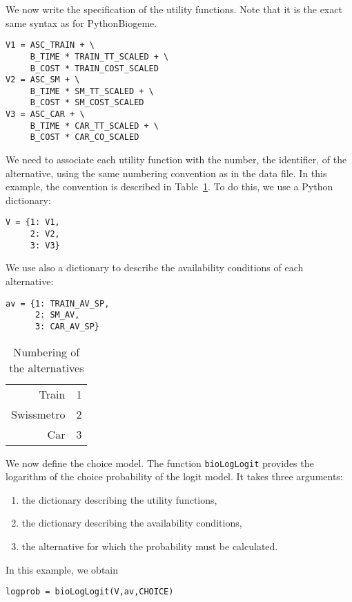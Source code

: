 \documentclass[12pt,a4paper]{article}
\newcommand{\PBIOGEME}{PythonBiogeme}
\begin{document}
We now write the specification of the
utility functions. Note that it is the exact same syntax as for \PBIOGEME.

\begin{lstlisting}[style=nonumbers]
V1 = ASC_TRAIN + \
     B_TIME * TRAIN_TT_SCALED + \
     B_COST * TRAIN_COST_SCALED
V2 = ASC_SM + \
     B_TIME * SM_TT_SCALED + \
     B_COST * SM_COST_SCALED
V3 = ASC_CAR + \
     B_TIME * CAR_TT_SCALED + \
     B_COST * CAR_CO_SCALED
\end{lstlisting}

We need to associate each utility function with the number, the identifier, of the
alternative, using the same numbering convention as in the data file. In this
example, the convention is described in Table~\ref{tab:choice}. To do
this, we use a Python dictionary:
\begin{lstlisting}[style=nonumbers]
V = {1: V1,
     2: V2,
     3: V3}
\end{lstlisting}
We use also a dictionary to describe the availability conditions of
each alternative:
\begin{lstlisting}[style=nonumbers]
av = {1: TRAIN_AV_SP,
      2: SM_AV,
      3: CAR_AV_SP}
\end{lstlisting}

\begin{table}[htb]
\begin{center}
\begin{tabular}{rl}
Train & 1 \\
Swissmetro & 2 \\
Car & 3
\end{tabular}
\end{center}
\caption{\label{tab:choice}Numbering of the alternatives}
\end{table}

We now define the choice model. The function \lstinline+bioLogLogit+
provides the logarithm of the choice probability of the logit
model. It takes three arguments: 
\begin{enumerate}
\item the dictionary describing the utility functions,
\item the dictionary describing the availability conditions,
\item the alternative for which the probability must be calculated.
\end{enumerate}
In this example, we obtain
\begin{lstlisting}[style=nonumbers]
logprob = bioLogLogit(V,av,CHOICE)
\end{lstlisting}
\end{document}
